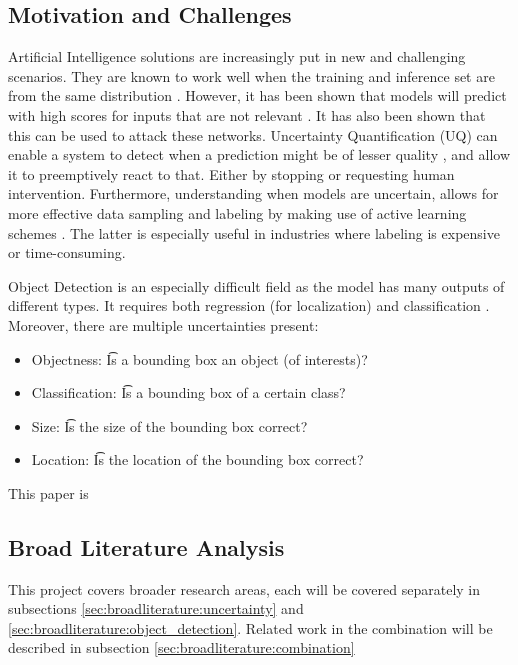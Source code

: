 \subsection{Motivation and Challenges}

Artificial Intelligence solutions are increasingly put in new and challenging scenarios. They are known to work well when the training and inference set are from the same distribution \cite{krizhevsky2012imagenet}. However, it has been shown that models will predict with high scores for inputs that are not relevant \cite{Nguyen_2015_CVPR,szegedy2013intriguing}. It has also been shown that this can be used to attack these networks\cite{goodfellow2014explaining,dong2018boosting}.
Uncertainty Quantification (UQ) can enable a system to detect when a prediction might be of lesser quality \cite{däubener2020detecting}, and allow it to preemptively react to that\cite{osti_1481629}. Either by stopping or requesting human intervention.
Furthermore, understanding when models are uncertain, allows for more effective data sampling and labeling by making use of active learning schemes \cite{settles2009active,Bernhardt_2022,yang2009effective}. The latter is especially useful in industries where labeling is expensive or time-consuming.

Object Detection is an especially difficult field as the model has many outputs of different types. It requires both regression (for localization) and classification \cite{Gasperini_2022}. Moreover, there are multiple uncertainties present:
\begin{itemize}
    \item Objectness: \t Is a bounding box an object (of interests)?
    \item Classification: \t Is a bounding box of a certain class?
    \item Size: \t Is the size of the bounding box correct?
    \item Location: \t Is the location of the bounding box correct?
\end{itemize}

This paper is

\subsection{Broad Literature Analysis}\label{sec:broadliterature}

This project covers broader research areas, each will be covered separately in subsections \ref{sec:broadliterature:uncertainty} and \ref{sec:broadliterature:object_detection}. Related work in the combination will be described in subsection \ref{sec:broadliterature:combination}


